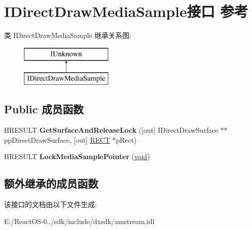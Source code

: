 \hypertarget{interface_i_direct_draw_media_sample}{}\section{I\+Direct\+Draw\+Media\+Sample接口 参考}
\label{interface_i_direct_draw_media_sample}
类 I\+Direct\+Draw\+Media\+Sample 继承关系图\+:\begin{figure}[H]
\begin{center}
\leavevmode
\includegraphics[height=2.000000cm]{interface_i_direct_draw_media_sample}
\end{center}
\end{figure}
\subsection*{Public 成员函数}
\begin{DoxyCompactItemize}
\item 
\mbox{\label{interface_i_direct_draw_media_sample_a2c006474b450677dd92d93074a67122f}} 
H\+R\+E\+S\+U\+LT {\bfseries Get\+Surface\+And\+Release\+Lock} (\mbox{[}out\mbox{]} I\+Direct\+Draw\+Surface $\ast$$\ast$pp\+Direct\+Draw\+Surface, \mbox{[}out\mbox{]} \hyperlink{structtag_r_e_c_t}{R\+E\+CT} $\ast$p\+Rect)
\item 
\mbox{\label{interface_i_direct_draw_media_sample_a8516843bb619f3f973cccf9857fa9116}} 
H\+R\+E\+S\+U\+LT {\bfseries Lock\+Media\+Sample\+Pointer} (\hyperlink{interfacevoid}{void})
\end{DoxyCompactItemize}
\subsection*{额外继承的成员函数}


该接口的文档由以下文件生成\+:\begin{DoxyCompactItemize}
\item 
E\+:/\+React\+O\+S-\/0../sdk/include/dxsdk/amstream.\+idl\end{DoxyCompactItemize}
